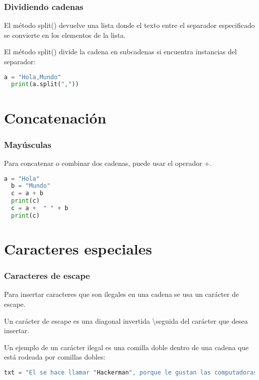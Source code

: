 \begin{frame}[fragile]
  \frametitle{Dividiendo cadenas}

  El método \textcolor{codeKeyword}{split}() devuelve una lista donde
  el texto entre el separador especificado se convierte en los elementos
  de la lista.

  \vspace{\baselineskip}
  El método \textcolor{codeKeyword}{split}() divide la cadena en
  subcadenas si encuentra instancias del separador:
  \begin{lstlisting}[language=Python]
  a = "Hola,Mundo"
  print(a.split(","))
  \end{lstlisting}
\end{frame}


\section{Concatenación}

\begin{frame}[fragile]
  \frametitle{Mayúsculas}

  Para concatenar o combinar dos cadenas, puede usar el operador +.

  \begin{lstlisting}[language=Python]
  a = "Hola"
  b = "Mundo"
  c = a + b
  print(c)
  c = a +  " " + b
  print(c)
  \end{lstlisting}
\end{frame}


\section{Caracteres especiales}

\begin{frame}[fragile]
  \frametitle{Caracteres de escape}

  Para insertar caracteres que son ilegales en una cadena se
  usa un carácter de escape.

  \vspace{\baselineskip}
  Un carácter de escape es una diagonal invertida \textbackslash seguida del
  carácter que desea insertar.

  \vspace{\baselineskip}
  Un ejemplo de un carácter ilegal es una comilla doble dentro
  de una cadena que está rodeada por comillas dobles: 

  \vspace{\baselineskip}
  \begin{lstlisting}[language=Python]
  txt = "El se hace llamar "Hackerman", porque le gustan las computadoras"
  \end{lstlisting}
\end{frame}

